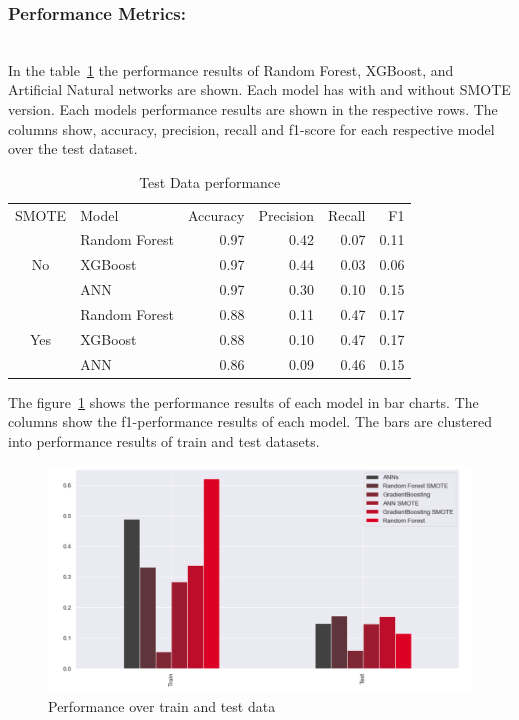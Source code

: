 \subsubsection{Performance Metrics:}\hspace*{\fill} \\
In the table~\ref{tab:per_res} the performance results of Random Forest, XGBoost, and Artificial Natural networks are shown. Each model has with and without SMOTE version. Each models performance results are shown in the respective rows. The columns show, accuracy, precision, recall and f1-score for each respective model over the test dataset. 
\begin{table}[H]
    \begin{tabular}{clrrrr}
    \cline{1-6}
    \multicolumn{1}{l}{SMOTE} & Model         & \multicolumn{1}{l}{Accuracy} & \multicolumn{1}{l}{Precision} & \multicolumn{1}{l}{Recall} & F1 \\ \cline{1-6} 
    \multirow{3}{*}{No}       & Random Forest &0.97  & 0.42  & 0.07  & 0.11 \\
                              & XGBoost       &0.97  & 0.44  & 0.03  & 0.06 \\
                              & ANN           &0.97  & 0.30  & 0.10  & 0.15 \\ \cline{1-6} 
    \multirow{3}{*}{Yes}       & Random Forest &0.88  & 0.11  & 0.47  & 0.17 \\
                              & XGBoost       &0.88  & 0.10  & 0.47  & 0.17 \\
                              & ANN           &0.86  & 0.09  & 0.46  & 0.15 \\ \cline{1-6} 
    \end{tabular}
    \caption{Test Data performance}
    \label{tab:per_res}
\end{table}


The figure~\ref{fig:test_train} shows the performance results of each model in bar charts. The columns show the f1-performance results of each model. The bars are clustered into performance results of train and test datasets. 

\begin{figure}[H]
    \centering
    \includegraphics[width=\linewidth]{figures/results.PNG}
    \caption{Performance over train and test data}
    \label{fig:test_train}
\end{figure}

